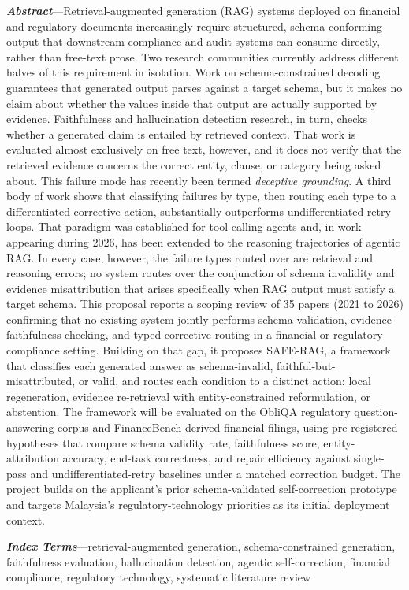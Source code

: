 \documentclass[10pt,twocolumn,letterpaper]{article}
\renewenvironment{abstract}{\small}{\par}
\begin{document}
\begin{abstract}
\noindent\textbf{\textit{Abstract}}---Retrieval-augmented generation (RAG) systems deployed on financial and regulatory documents increasingly require structured, schema-conforming output that downstream compliance and audit systems can consume directly, rather than free-text prose. Two research communities currently address different halves of this requirement in isolation. Work on schema-constrained decoding guarantees that generated output parses against a target schema, but it makes no claim about whether the values inside that output are actually supported by evidence. Faithfulness and hallucination detection research, in turn, checks whether a generated claim is entailed by retrieved context. That work is evaluated almost exclusively on free text, however, and it does not verify that the retrieved evidence concerns the correct entity, clause, or category being asked about. This failure mode has recently been termed \emph{deceptive grounding}. A third body of work shows that classifying failures by type, then routing each type to a differentiated corrective action, substantially outperforms undifferentiated retry loops. That paradigm was established for tool-calling agents and, in work appearing during 2026, has been extended to the reasoning trajectories of agentic RAG. In every case, however, the failure types routed over are retrieval and reasoning errors; no system routes over the conjunction of schema invalidity and evidence misattribution that arises specifically when RAG output must satisfy a target schema. This proposal reports a scoping review of 35 papers (2021 to 2026) confirming that no existing system jointly performs schema validation, evidence-faithfulness checking, and typed corrective routing in a financial or regulatory compliance setting. Building on that gap, it proposes SAFE-RAG, a framework that classifies each generated answer as schema-invalid, faithful-but-misattributed, or valid, and routes each condition to a distinct action: local regeneration, evidence re-retrieval with entity-constrained reformulation, or abstention. The framework will be evaluated on the ObliQA regulatory question-answering corpus and FinanceBench-derived financial filings, using pre-registered hypotheses that compare schema validity rate, faithfulness score, entity-attribution accuracy, end-task correctness, and repair efficiency against single-pass and undifferentiated-retry baselines under a matched correction budget. The project builds on the applicant's prior schema-validated self-correction prototype and targets Malaysia's regulatory-technology priorities as its initial deployment context.

\vspace{0.6em}
\noindent\textbf{\textit{Index Terms}}---retrieval-augmented generation, schema-constrained generation, faithfulness evaluation, hallucination detection, agentic self-correction, financial compliance, regulatory technology, systematic literature review
\end{abstract}
\end{document}
